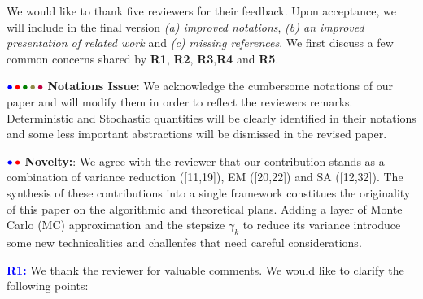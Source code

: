 \documentclass{article}
\begin{document}
We would like to thank five reviewers for their feedback. Upon acceptance, we will include in the final version \emph{{\sf (a)} improved notations}, \emph{{\sf (b)} an improved presentation of related work} and \emph{{\sf (c)} missing references}. 
We first discuss a few common concerns shared by \textbf{\color{blue}R1}, \textbf{\color{red} R2}, \textbf{\color{green!50!black}R3},\textbf{\color{yellow!50!black}R4} and \textbf{\color{purple}R5}.

${\color{blue}\bullet}\!~{\color{red}\bullet}\!~{\color{green!50!black}\bullet}\!~{\color{yellow!50!black}\bullet}\!~{\color{purple}\bullet}$ \textbf{Notations Issue}: 
We acknowledge the cumbersome notations of our paper and will modify them in order to reflect the reviewers remarks. 
Deterministic and Stochastic quantities will be clearly identified in their notations and some less important abstractions will be dismissed in the revised paper.


${\color{blue}\bullet}\!~{\color{red}\bullet}$ \textbf{Novelty:}: 
We agree with the reviewer that our contribution stands as a combination of variance reduction ([11,19]), EM ([20,22]) and SA ([12,32]). 
The synthesis of these contributions into a single framework constitues the originality of this paper on the algorithmic and theoretical plans.
Adding a layer of Monte Carlo (MC) approximation and the stepsize $\gamma_k$ to reduce its variance introduce some new technicalities and challenfes that need careful considerations.\vspace{-0.05in}





\textbf{\textcolor{blue}{R1:}} We thank the reviewer for valuable comments. We would like to clarify the following points:\vspace{-0.05in}

\end{document}
